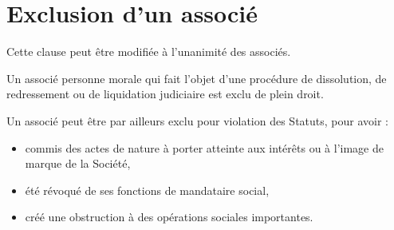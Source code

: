 \documentclass[a4paper,12pt]{report}
\begin{document}
%
%
%
%
%
%
%

\section{Exclusion d'un associé}
Cette clause peut être modifiée à l'unanimité des associés.

Un associé personne morale qui fait l'objet d'une procédure de dissolution, de redressement ou de liquidation judiciaire est exclu de plein droit.

Un associé peut être par ailleurs exclu pour violation des Statuts, pour avoir :
\begin{itemize}
	\item commis des actes de nature à porter atteinte aux intérêts ou à l'image de marque de la Société,
	\item été révoqué de ses fonctions de mandataire social,
	\item créé une obstruction à des opérations sociales importantes.
\end{itemize}
\end{document}
